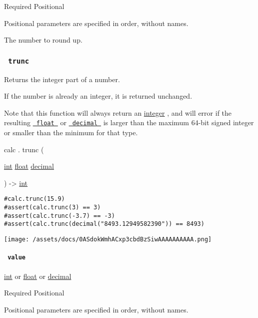 {Required} {{ Positional }}

\label{functions-ceil-value-positional-tooltip}
Positional parameters are specified in order, without names.

The number to round up.

\subsubsection{\texorpdfstring{\texttt{\ trunc\ }}{ trunc }}\label{functions-trunc}

Returns the integer part of a number.

If the number is already an integer, it is returned unchanged.

Note that this function will always return an
\href{/docs/reference/foundations/int/}{integer} , and will error if the
resulting \href{/docs/reference/foundations/float/}{\texttt{\ float\ }}
or \href{/docs/reference/foundations/decimal/}{\texttt{\ decimal\ }} is
larger than the maximum 64-bit signed integer or smaller than the
minimum for that type.

calc { . } { trunc } (

{ \href{/docs/reference/foundations/int/}{int}
\href{/docs/reference/foundations/float/}{float}
\href{/docs/reference/foundations/decimal/}{decimal} }

) -\textgreater{} \href{/docs/reference/foundations/int/}{int}

\begin{verbatim}
#calc.trunc(15.9)
#assert(calc.trunc(3) == 3)
#assert(calc.trunc(-3.7) == -3)
#assert(calc.trunc(decimal("8493.12949582390")) == 8493)
\end{verbatim}

\texttt{[image: /assets/docs/0ASdokWmhACxp3cbdBzSiwAAAAAAAAAA.png]}

\paragraph{\texorpdfstring{\texttt{\ value\ }}{ value }}\label{functions-trunc-value}

\href{/docs/reference/foundations/int/}{int} {or}
\href{/docs/reference/foundations/float/}{float} {or}
\href{/docs/reference/foundations/decimal/}{decimal}

{Required} {{ Positional }}

\label{functions-trunc-value-positional-tooltip}
Positional parameters are specified in order, without names.

